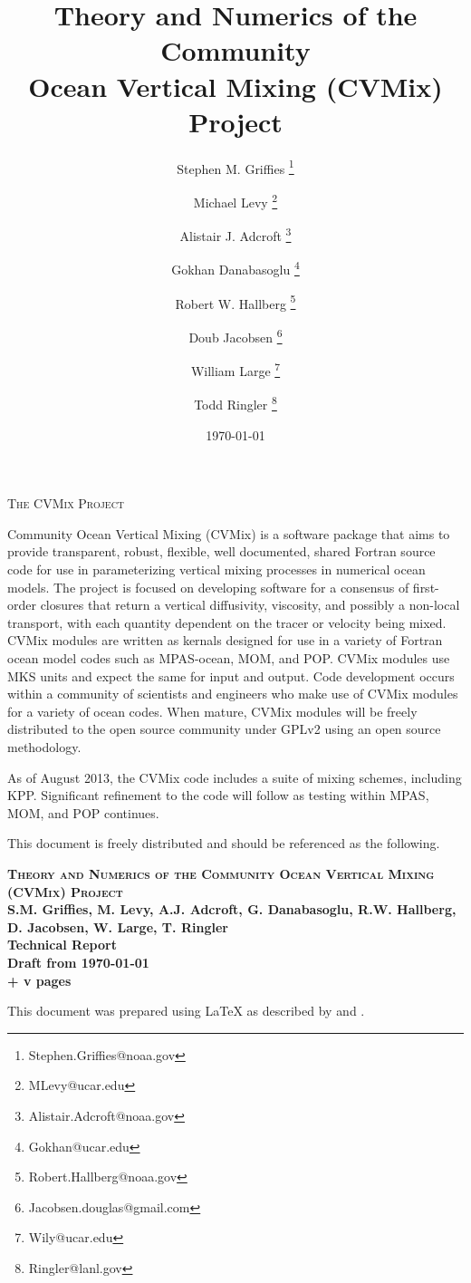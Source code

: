 \documentclass[10pt]{book}
\title{\sc Theory and Numerics of the Community 
         \\ Ocean Vertical Mixing (CVMix) Project}
\date{\today}
\author[$\star$]{Stephen M. Grif\/f\/ies \thanks{Stephen.Griffies@noaa.gov}}
\affil[$\star$]{NOAA/Geophysical Fluid Dynamics Laboratory, Princeton USA}
\author[$\dagger$]{Michael Levy \thanks{MLevy@ucar.edu}}
\affil[$\dagger$]{National Center for Atmospheric Research, Boulder USA}
\author[$\star$]{Alistair J. Adcroft \thanks{Alistair.Adcroft@noaa.gov}}
\author[$\dagger$]{Gokhan Danabasoglu \thanks{Gokhan@ucar.edu}}
\author[$\star$]{Robert W. Hallberg \thanks{Robert.Hallberg@noaa.gov}}
\author[$\triangle$]{Doub Jacobsen \thanks{Jacobsen.douglas@gmail.com}}
\affil[$\triangle$]{Los Alamos National Laboratory, Los Alamos USA}
\author[$\dagger$]{William Large \thanks{Wily@ucar.edu}}
\author[$\triangle$]{Todd Ringler \thanks{Ringler@lanl.gov}}
\begin{document}
\maketitle 
\thispagestyle{empty}

\begin{center}
{\scshape \Large The CVMix Project} 
\end{center}

{\sc Community Ocean Vertical Mixing (CVMix)} is a software package
that aims to provide transparent, robust, flexible, well documented,
shared Fortran source code for use in parameterizing vertical mixing
processes in numerical ocean models.  The project is focused on
developing software for a consensus of first-order closures that
return a vertical diffusivity, viscosity, and possibly a non-local
transport, with each quantity dependent on the tracer or velocity
being mixed.  CVMix modules are written as kernals designed for use in
a variety of Fortran ocean model codes such as MPAS-ocean, MOM, and
POP.  CVMix modules use MKS units and expect the same for input and
output.  Code development occurs within a community of scientists and
engineers who make use of CVMix modules for a variety of ocean codes.
When mature, CVMix modules will be freely distributed to the open
source community under GPLv2 using an open source methodology.

As of August 2013, the CVMix code includes a suite of mixing schemes,
including KPP. Significant refinement to the code will follow as
testing within MPAS, MOM, and POP continues. 


\vspace{2cm}

\noindent
This document is freely distributed and should be referenced as the
following. \vspace{.25cm}

\noindent
{\bf 
{\scshape{Theory and Numerics of the Community Ocean Vertical
    Mixing (CVMix) Project}}
\\
S.M. Grif\/f\/ies, M. Levy, A.J. Adcroft, G. Danabasoglu,
R.W. Hallberg,  D. Jacobsen, W. Large, T. Ringler
\\
Technical Report
\\
Draft from \today 
\\
\pageref{LastPage} + v pages\\
}
\vspace{.4cm}



\noindent
This document was prepared using \LaTeX \hspace{.1cm} as described by
\cite{Latex} and \cite{LatexCompanion}.
\end{document}
